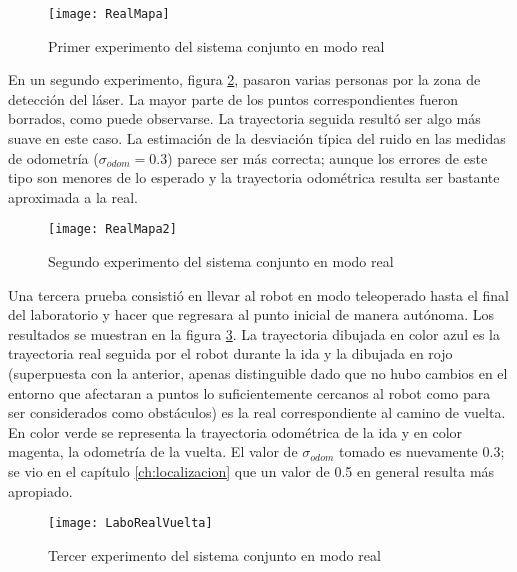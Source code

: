 \begin{figure}[h]
  \centering\texttt{[image: RealMapa]}\\
  \caption{ Primer experimento del sistema conjunto en modo real}\label{fg:RealMapa1}
\end{figure}

En un segundo experimento, figura \ref{fg:RealMapa2}, pasaron varias personas por la zona de detección del láser. La mayor parte de los puntos correspondientes fueron borrados, como puede observarse. La trayectoria seguida resultó ser algo más suave en este caso. La estimación de la desviación típica del ruido en las medidas de odometría ($\sigma_{odom} = 0.3$) parece ser más correcta; aunque los errores de este tipo son menores de lo esperado y la trayectoria odométrica resulta ser bastante aproximada a la real.

\begin{figure}[h]
  \centering\texttt{[image: RealMapa2]}\\
  \caption{ Segundo experimento del sistema conjunto en modo real}\label{fg:RealMapa2}
\end{figure}

Una tercera prueba consistió en llevar al robot en modo teleoperado hasta el final del laboratorio y hacer que regresara al punto inicial de manera autónoma. Los resultados se muestran en la figura \ref{fg:LaboRealVuelta}. La trayectoria dibujada en color azul es la trayectoria real seguida por el robot durante la ida y la dibujada en rojo (superpuesta con la anterior, apenas distinguible dado que no hubo cambios en el entorno que afectaran a puntos lo suficientemente cercanos al robot como para ser considerados como obstáculos) es la real correspondiente al camino de vuelta. En color verde se representa la trayectoria odométrica de la ida y en color magenta, la odometría de la vuelta. El valor de $\sigma_{odom}$ tomado es nuevamente 0.3; se vio en el capítulo \ref{ch:localizacion} que un valor de 0.5 en general resulta más apropiado.

\begin{figure}[h]
  \centering\texttt{[image: LaboRealVuelta]}\\
  \caption{ Tercer experimento del sistema conjunto en modo real}\label{fg:LaboRealVuelta}
\end{figure} 